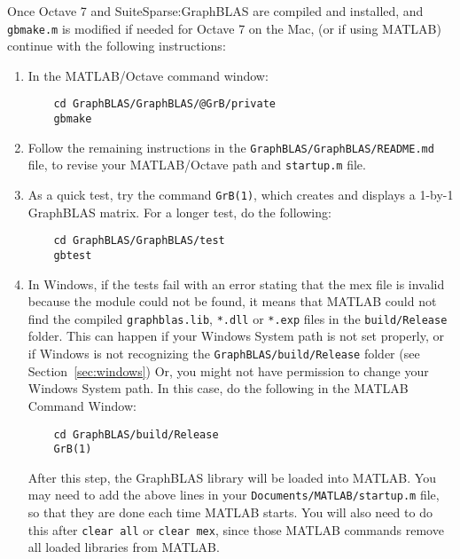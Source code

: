 \documentclass[12pt]{article}
\begin{document}
Once Octave 7 and SuiteSparse:GraphBLAS are compiled and installed,
and \verb'gbmake.m' is modified if needed for Octave 7 on the Mac,
(or if using MATLAB) continue with the following instructions:

\begin{enumerate}
\item In the MATLAB/Octave command window:

    {\small
    \begin{verbatim}
    cd GraphBLAS/GraphBLAS/@GrB/private
    gbmake \end{verbatim} }

\item Follow the remaining instructions in the
    \verb'GraphBLAS/GraphBLAS/README.md' file, to revise your
    MATLAB/Octave path and \verb'startup.m' file.

\item As a quick test, try the command \verb'GrB(1)', which
    creates and displays a 1-by-1 GraphBLAS matrix.  For a longer test, do the
    following:

    {\small
    \begin{verbatim}
    cd GraphBLAS/GraphBLAS/test
    gbtest \end{verbatim} }

\item In Windows, if the tests fail with an error stating that the
    mex file is invalid because the module could not be found, it means
    that MATLAB could not find the compiled \verb'graphblas.lib', \verb'*.dll'
    or \verb'*.exp' files in the \verb'build/Release' folder.  This can happen
    if your Windows System path is not set properly, or if Windows is not
    recognizing the \verb'GraphBLAS/build/Release' folder (see
    Section~\ref{sec:windows})  Or, you might not have permission to change your
    Windows System path.  In this case, do the following in the MATLAB Command
    \vspace{-0.1in}
    Window:

    \vspace{-0.1in}
    {\small
    \begin{verbatim}
    cd GraphBLAS/build/Release
    GrB(1) \end{verbatim} }

    \vspace{-0.1in}
    After this step, the GraphBLAS library will be loaded into MATLAB.  You may
    need to add the above lines in your \verb'Documents/MATLAB/startup.m' file,
    so that they are done each time MATLAB starts.  You will also need to do
    this after \verb'clear all' or \verb'clear mex', since those MATLAB
    commands remove all loaded libraries from MATLAB.


\end{enumerate}
\end{document}
